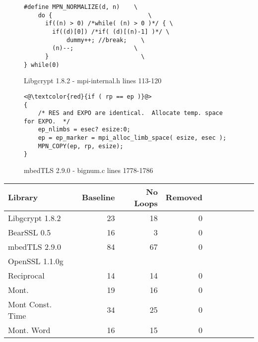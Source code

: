 \begin{figure}[h!]
\begin{lstlisting}
#define MPN_NORMALIZE(d, n)    \
    do {		                   \
      if((n) > 0) /*while( (n) > 0 )*/ { \
        if((d)[0]) /*if( (d)[(n)-1] )*/ \
            dummy++; //break;	 \
        (n)--;	               \
      }		                     \
} while(0)
\end{lstlisting}
\caption{Libgcrypt 1.8.2 - mpi-internal.h lines 113-120}
\label{code:libgcrypt_normalize}
\end{figure}


\begin{figure}[h!]
\begin{lstlisting}
<@\textcolor{red}{if ( rp == ep )}@>
{
    /* RES and EXPO are identical.  Allocate temp. space for EXPO.  */
    ep_nlimbs = esec? esize:0;
    ep = ep_marker = mpi_alloc_limb_space( esize, esec );
    MPN_COPY(ep, rp, esize);
}
\end{lstlisting}
\caption{mbedTLS 2.9.0 - bignum.c lines 1778-1786}
\label{code:libgcrypt_normalize}
\end{figure}


\begin{table*}[!t]
  \centering
    \ra{1.2}
  \begin{tabular}{@{}lcrrrrcrrrr@{}}
    \toprule
    Library && Baseline & No Loops & Removed \\
    \midrule
    Libgcrypt 1.8.2                	    	 && 23 & 18 & 0 \\
    BearSSL 0.5                     	    	 && 16 & 3 & 0 \\
    mbedTLS 2.9.0                          	 && 84 & 67 & 0 \\
    OpenSSL 1.1.0g                                                                                 \\
    \hspace{0.25cm}Reciprocal       	 && 14 & 14 & 0 \\
    \hspace{0.25cm}Mont.            	 && 19 & 16 & 0 \\
    \hspace{0.25cm}Mont Const. Time && 34 & 25 & 0 \\
    \hspace{0.25cm}Mont. Word       	 && 16 & 15 & 0 \\
    \bottomrule
  \end{tabular}
\caption{ }
\label{tbl:runtimes}
\end{table*}
